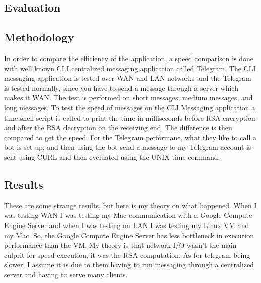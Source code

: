 \documentclass[twoside]{article}
\begin{document}
\begin{multicols}{2}
\section{Evaluation}


\subsection{Methodology}
In order to compare the efficiency of the application, a speed comparison is done with well known CLI centralized messaging application called Telegram. The CLI messaging application is tested over WAN and LAN networks and the Telegram is tested normally, since you have to send a message through a server which makes it  WAN. The test is performed on short messages, medium messages, and long messages. To test the speed of messages on the CLI Messaging application a time shell script is called to print the time in milliseconds before RSA encryption and after the RSA decryption on the receiving end. The difference is then compared to get the speed. For the Telegram performane, what they like to call a bot is set up, and then using the bot send a message to my Telegram account is sent using CURL and then eveluated using the UNIX time command. 

\subsection{Results}
These are some strange results, but here is my theory on what happened.
When I was testing WAN I was testing my Mac communication with a Google Compute Engine Server and when I was testing on LAN I was testing my Linux VM and my Mac. So, the Google Compute Engine Server has less bottleneck in execution performance than the VM. My theory is that network I/O wasn’t the main culprit for speed execution, it was the RSA computation.
As for telegram being slower, I assume it is due to them having to run messaging through a centralized server and having to serve many clients.



\end{multicols}
\end{document}
